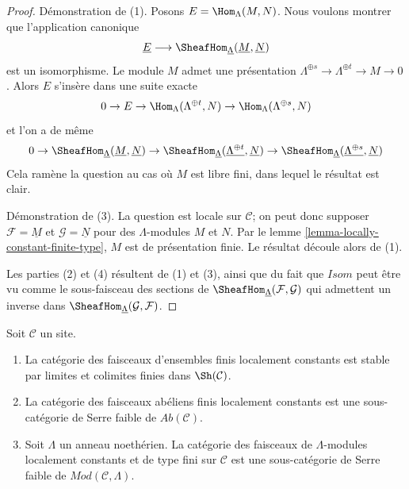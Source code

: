 \begin{proof}
Démonstration de (1). Posons $E = \Hom_\Lambda(M, N)$. Nous voulons montrer que
l'application canonique
$$
\underline{E}
\longrightarrow
\SheafHom_{\underline{\Lambda}}(\underline{M}, \underline{N})
$$
est un isomorphisme. Le module $M$ admet une présentation
$\Lambda^{\oplus s} \to \Lambda^{\oplus t} \to M \to 0$.
Alors $E$ s'insère dans une suite exacte
$$
0 \to E \to \Hom_\Lambda(\Lambda^{\oplus t}, N) \to
\Hom_\Lambda(\Lambda^{\oplus s}, N)
$$
et l'on a de même
$$
0 \to
\SheafHom_{\underline{\Lambda}}(\underline{M}, \underline{N}) \to
\SheafHom_{\underline{\Lambda}}(\underline{\Lambda^{\oplus t}}, \underline{N})
\to
\SheafHom_{\underline{\Lambda}}(\underline{\Lambda^{\oplus s}}, \underline{N})
$$
Cela ramène la question au cas où $M$ est libre fini, dans lequel le résultat
est clair.

\medskip\noindent
Démonstration de (3). La question est locale sur $\mathcal{C}$; on peut donc
supposer $\mathcal{F} = \underline{M}$ et $\mathcal{G} = \underline{N}$ pour des
$\Lambda$-modules $M$ et $N$. Par le
lemme \ref{lemma-locally-constant-finite-type}, $M$ est de présentation finie.
Le résultat découle alors de (1).

\medskip\noindent
Les parties (2) et (4) résultent de (1) et (3), ainsi que du fait que
$\mathit{Isom}$ peut être vu comme le sous-faisceau des sections de
$\SheafHom_{\underline{\Lambda}}(\mathcal{F}, \mathcal{G})$
qui admettent un inverse dans
$\SheafHom_{\underline{\Lambda}}(\mathcal{G}, \mathcal{F})$.
\end{proof}

\begin{lemma}
\label{lemma-kernel-finite-locally-constant}
Soit $\mathcal{C}$ un site.
\begin{enumerate}
\item La catégorie des faisceaux d'ensembles finis localement constants est
stable par limites et colimites finies dans $\Sh(\mathcal{C})$.
\item La catégorie des faisceaux abéliens finis localement constants est une
sous-catégorie de Serre faible de $\textit{Ab}(\mathcal{C})$.
\item Soit $\Lambda$ un anneau noethérien. La catégorie des faisceaux de
$\Lambda$-modules localement constants et de type fini sur $\mathcal{C}$ est
une sous-catégorie de Serre faible de $\textit{Mod}(\mathcal{C}, \Lambda)$.
\end{enumerate}
\end{lemma}

